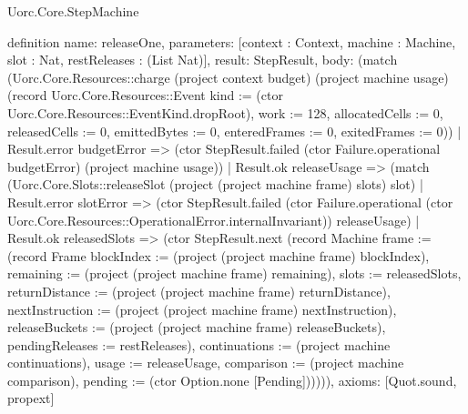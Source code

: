 \begin{lexlean}{Uorc.Core.StepMachine}
\begin{semanticmodule}
definition{
  name: releaseOne,
  parameters: [context : Context, machine : Machine, slot : Nat, restReleases : (List Nat)],
  result: StepResult,
  body: (match (Uorc.Core.Resources::charge (project context budget) (project machine usage) (record Uorc.Core.Resources::Event {kind := (ctor Uorc.Core.Resources::EventKind.dropRoot), work := 128, allocatedCells := 0, releasedCells := 0, emittedBytes := 0, enteredFrames := 0, exitedFrames := 0}))
    | Result.error budgetError => (ctor StepResult.failed (ctor Failure.operational budgetError) (project machine usage))
    | Result.ok releaseUsage => (match (Uorc.Core.Slots::releaseSlot (project (project machine frame) slots) slot)
      | Result.error slotError => (ctor StepResult.failed (ctor Failure.operational (ctor Uorc.Core.Resources::OperationalError.internalInvariant)) releaseUsage)
      | Result.ok releasedSlots => (ctor StepResult.next (record Machine {frame := (record Frame {blockIndex := (project (project machine frame) blockIndex), remaining := (project (project machine frame) remaining), slots := releasedSlots, returnDistance := (project (project machine frame) returnDistance), nextInstruction := (project (project machine frame) nextInstruction), releaseBuckets := (project (project machine frame) releaseBuckets), pendingReleases := restReleases}), continuations := (project machine continuations), usage := releaseUsage, comparison := (project machine comparison), pending := (ctor Option.none [Pending])})))),
  axioms: [Quot.sound, propext]
}


\end{semanticmodule}
\end{lexlean}
